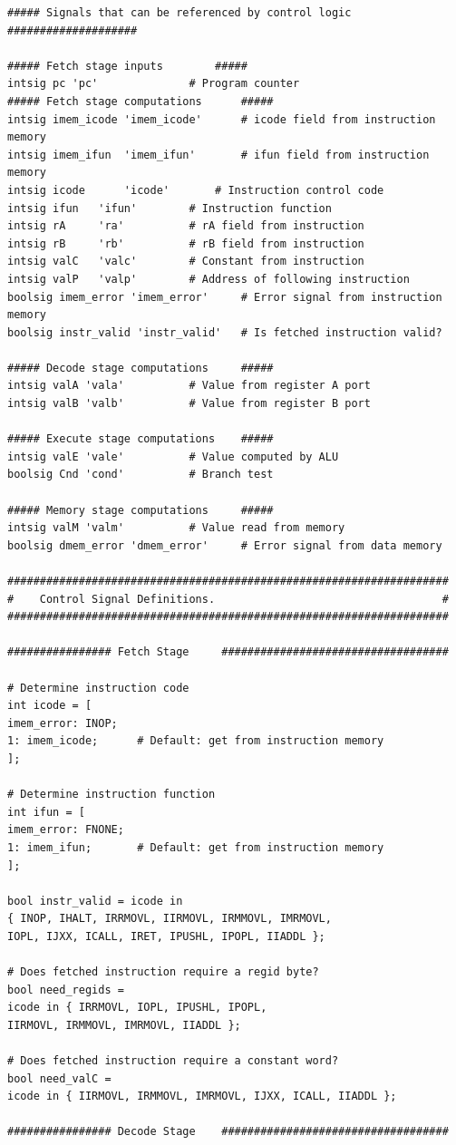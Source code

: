 \documentclass{article}
\begin{document}
\begin{lstlisting}[numberstyle=\scriptsize, basicstyle=\scriptsize]
##### Signals that can be referenced by control logic ####################

##### Fetch stage inputs		#####
intsig pc 'pc'				# Program counter
##### Fetch stage computations		#####
intsig imem_icode 'imem_icode'		# icode field from instruction memory
intsig imem_ifun  'imem_ifun' 		# ifun field from instruction memory
intsig icode	  'icode'		# Instruction control code
intsig ifun	  'ifun'		# Instruction function
intsig rA	  'ra'			# rA field from instruction
intsig rB	  'rb'			# rB field from instruction
intsig valC	  'valc'		# Constant from instruction
intsig valP	  'valp'		# Address of following instruction
boolsig imem_error 'imem_error'		# Error signal from instruction memory
boolsig instr_valid 'instr_valid'	# Is fetched instruction valid?

##### Decode stage computations		#####
intsig valA	'vala'			# Value from register A port
intsig valB	'valb'			# Value from register B port

##### Execute stage computations	#####
intsig valE	'vale'			# Value computed by ALU
boolsig Cnd	'cond'			# Branch test

##### Memory stage computations		#####
intsig valM	'valm'			# Value read from memory
boolsig dmem_error 'dmem_error'		# Error signal from data memory

####################################################################
#    Control Signal Definitions.                                   #
####################################################################

################ Fetch Stage     ###################################

# Determine instruction code
int icode = [
imem_error: INOP;
1: imem_icode;		# Default: get from instruction memory
];

# Determine instruction function
int ifun = [
imem_error: FNONE;
1: imem_ifun;		# Default: get from instruction memory
];

bool instr_valid = icode in 
{ INOP, IHALT, IRRMOVL, IIRMOVL, IRMMOVL, IMRMOVL,
IOPL, IJXX, ICALL, IRET, IPUSHL, IPOPL, IIADDL };

# Does fetched instruction require a regid byte?
bool need_regids =
icode in { IRRMOVL, IOPL, IPUSHL, IPOPL, 
IIRMOVL, IRMMOVL, IMRMOVL, IIADDL };

# Does fetched instruction require a constant word?
bool need_valC =
icode in { IIRMOVL, IRMMOVL, IMRMOVL, IJXX, ICALL, IIADDL };

################ Decode Stage    ###################################


\end{lstlisting}
\end{document}
